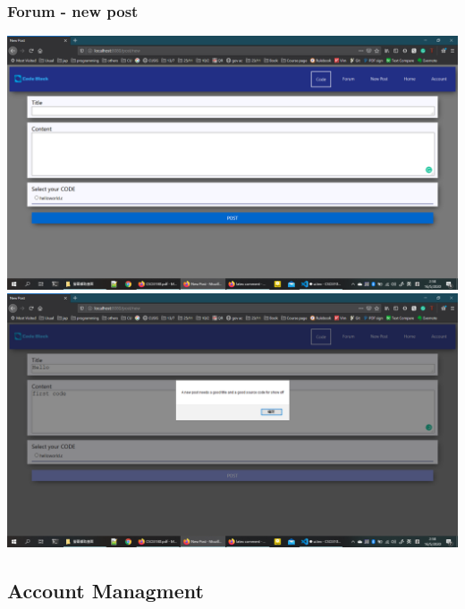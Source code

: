\subsubsection{Forum - new post}
\includegraphics[scale=0.45]{Doc/Pics/new_post.png}
\includegraphics[scale=0.45]{Doc/Pics/new_post_warn.png}

\subsection{Account Managment}
